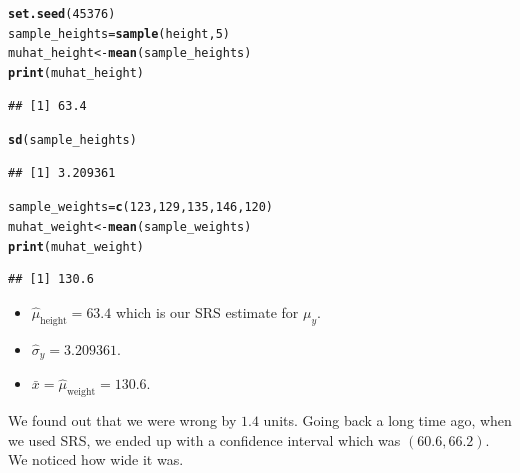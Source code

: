 \documentclass[oneside]{book}\usepackage[]{graphicx}\usepackage[dvipsnames,table,xcdraw]{xcolor}
\makeatletter
\newcommand{\hlnum}[1]{\textcolor[rgb]{0.686,0.059,0.569}{#1}}%
\newcommand{\hlstd}[1]{\textcolor[rgb]{0.345,0.345,0.345}{#1}}%
\newcommand{\hlkwb}[1]{\textcolor[rgb]{0.69,0.353,0.396}{#1}}%
\newcommand{\hlkwd}[1]{\textcolor[rgb]{0.737,0.353,0.396}{\textbf{#1}}}%
\newenvironment{kframe}{%
 \def\at@end@of@kframe{}%
 \ifinner\ifhmode%
  \def\at@end@of@kframe{\end{minipage}}%
  \begin{minipage}{\columnwidth}%
 \fi\fi%
 \def\FrameCommand##1{\hskip\@totalleftmargin \hskip-\fboxsep
 \colorbox{shadecolor}{##1}\hskip-\fboxsep
     \hskip-\linewidth \hskip-\@totalleftmargin \hskip\columnwidth}%
 \MakeFramed {\advance\hsize-\width
   \@totalleftmargin\z@ \linewidth\hsize
   \@setminipage}}%
 {\par\unskip\endMakeFramed%
 \at@end@of@kframe}
\newenvironment{knitrout}{}{} %
\makeatother
\begin{document}
\begin{knitrout}
\color{fgcolor}\begin{kframe}
\begin{alltt}
\hlkwd{set.seed}\hlstd{(}\hlnum{45376}\hlstd{)}
\hlstd{sample_heights} \hlkwb{=} \hlkwd{sample}\hlstd{(height,} \hlnum{5}\hlstd{)}
\hlstd{muhat_height} \hlkwb{<-} \hlkwd{mean}\hlstd{(sample_heights)}
\hlkwd{print}\hlstd{(muhat_height)}
\end{alltt}
\begin{verbatim}
## [1] 63.4
\end{verbatim}
\begin{alltt}
\hlkwd{sd}\hlstd{(sample_heights)}
\end{alltt}
\begin{verbatim}
## [1] 3.209361
\end{verbatim}
\begin{alltt}
\hlstd{sample_weights} \hlkwb{=} \hlkwd{c}\hlstd{(}\hlnum{123}\hlstd{,} \hlnum{129}\hlstd{,} \hlnum{135}\hlstd{,} \hlnum{146}\hlstd{,} \hlnum{120}\hlstd{)}
\hlstd{muhat_weight} \hlkwb{<-} \hlkwd{mean}\hlstd{(sample_weights)}
\hlkwd{print}\hlstd{(muhat_weight)}
\end{alltt}
\begin{verbatim}
## [1] 130.6
\end{verbatim}
\end{kframe}
\end{knitrout}
\begin{itemize}
    \item $\hat{\mu}_{\text{height}}=63.4$ which is our SRS estimate for $\mu_y$.
    \item $\hat{\sigma}_y=3.209361$.
    \item $\bar{x}=\hat{\mu}_{\text{weight}}=130.6$.
\end{itemize}
We found out that we were wrong by $1.4$ units. Going back a long time ago,
when we used SRS, we ended up with a confidence interval which
was $(60.6,66.2)$. We noticed how wide it was.
\end{document}
